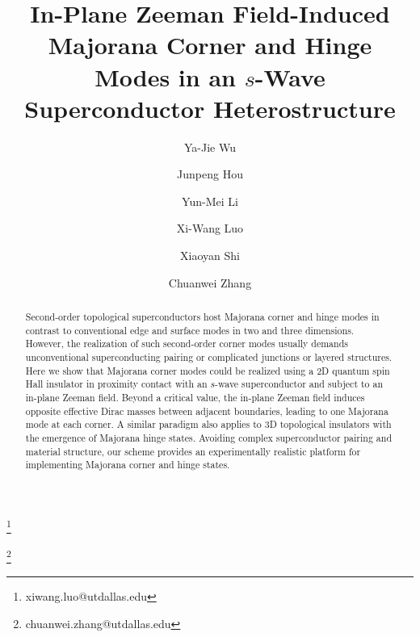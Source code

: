 \documentclass[twocolumn,prl,floatfix,citeautoscript,nofootinbib,superscriptaddress]{revtex4}
\begin{document}
\title{In-Plane Zeeman Field-Induced Majorana Corner and Hinge Modes in an $%
s $-Wave Superconductor Heterostructure}
\author{Ya-Jie Wu}
\author{Junpeng Hou}
\author{Yun-Mei Li}
\author{Xi-Wang Luo}
\thanks{xiwang.luo@utdallas.edu}
\author{Xiaoyan Shi}
\author{Chuanwei Zhang}
\thanks{chuanwei.zhang@utdallas.edu}

\begin{abstract}
Second-order topological superconductors host Majorana corner and hinge
modes in contrast to conventional edge and surface modes in two and three
dimensions. However, the realization of such second-order corner modes
usually demands unconventional superconducting pairing or complicated
junctions or layered structures. Here we show that Majorana corner modes
could be realized using a 2D quantum spin Hall insulator in proximity
contact with an $s$-wave superconductor and subject to an in-plane Zeeman
field. Beyond a critical value, the in-plane Zeeman field induces opposite
effective Dirac masses between adjacent boundaries, leading to one Majorana
mode at each corner. A similar paradigm also applies to 3D topological
insulators with the emergence of Majorana hinge states. Avoiding complex
superconductor pairing and material structure, our scheme provides an
experimentally realistic platform for implementing Majorana corner and hinge
states.
\end{abstract}

\maketitle
\end{document}
